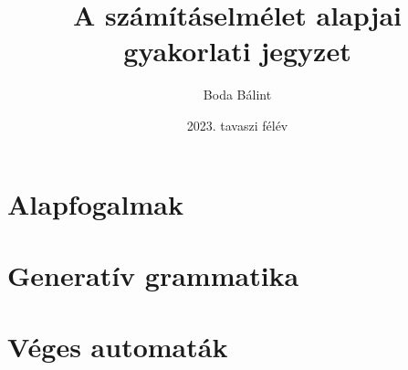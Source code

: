 \documentclass[a4paper,12pt]{report}
\title{\huge{A számításelmélet alapjai} \\[-4pt] \large gyakorlati jegyzet \vspace{-15pt}}
\author{Boda Bálint}
\date{\vspace{-12pt}2023. tavaszi félév}
\theoremstyle{definition}
\begin{document}
	\maketitle
	\vspace{-10pt}
	\tableofcontents
	\chapter{Alapfogalmak}
	
	\chapter{Generatív grammatika}
	
	\chapter{Véges automaták}
	
\end{document}
